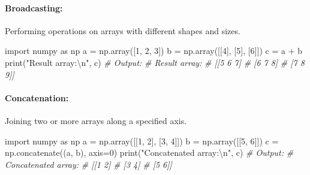 \documentclass[11pt]{article}
\newenvironment{Shaded}{}{}
\newcommand{\DecValTok}[1]{\textcolor[rgb]{0.25,0.63,0.44}{{#1}}}
\newcommand{\CharTok}[1]{\textcolor[rgb]{0.25,0.44,0.63}{{#1}}}
\newcommand{\StringTok}[1]{\textcolor[rgb]{0.25,0.44,0.63}{{#1}}}
\newcommand{\CommentTok}[1]{\textcolor[rgb]{0.38,0.63,0.69}{\textit{{#1}}}}
\newcommand{\NormalTok}[1]{{#1}}
\newcommand{\ImportTok}[1]{{#1}}
\newcommand{\OperatorTok}[1]{\textcolor[rgb]{0.40,0.40,0.40}{{#1}}}
\newcommand{\BuiltInTok}[1]{{#1}}
\begin{document}
\hypertarget{broadcasting}{%
\paragraph{Broadcasting:}\label{broadcasting}}

Performing operations on arrays with different shapes and sizes.

\begin{Shaded}
\begin{Highlighting}[]
\ImportTok{import}\NormalTok{ numpy }\ImportTok{as}\NormalTok{ np}
\NormalTok{a }\OperatorTok{=}\NormalTok{ np.array([}\DecValTok{1}\NormalTok{, }\DecValTok{2}\NormalTok{, }\DecValTok{3}\NormalTok{])}
\NormalTok{b }\OperatorTok{=}\NormalTok{ np.array([[}\DecValTok{4}\NormalTok{], [}\DecValTok{5}\NormalTok{], [}\DecValTok{6}\NormalTok{]])}
\NormalTok{c }\OperatorTok{=}\NormalTok{ a }\OperatorTok{+}\NormalTok{ b}
\BuiltInTok{print}\NormalTok{(}\StringTok{"Result array:}\CharTok{\textbackslash{}n}\StringTok{"}\NormalTok{, c)}
\CommentTok{\# Output:}
\CommentTok{\# Result array:}
\CommentTok{\#  [[5 6 7]}
\CommentTok{\#   [6 7 8]}
\CommentTok{\#   [7 8 9]]}
\end{Highlighting}
\end{Shaded}

\hypertarget{concatenation}{%
\paragraph{Concatenation:}\label{concatenation}}

Joining two or more arrays along a specified axis.

\begin{Shaded}
\begin{Highlighting}[]
\ImportTok{import}\NormalTok{ numpy }\ImportTok{as}\NormalTok{ np}
\NormalTok{a }\OperatorTok{=}\NormalTok{ np.array([[}\DecValTok{1}\NormalTok{, }\DecValTok{2}\NormalTok{], [}\DecValTok{3}\NormalTok{, }\DecValTok{4}\NormalTok{]])}
\NormalTok{b }\OperatorTok{=}\NormalTok{ np.array([[}\DecValTok{5}\NormalTok{, }\DecValTok{6}\NormalTok{]])}
\NormalTok{c }\OperatorTok{=}\NormalTok{ np.concatenate((a, b), axis}\OperatorTok{=}\DecValTok{0}\NormalTok{)}
\BuiltInTok{print}\NormalTok{(}\StringTok{"Concatenated array:}\CharTok{\textbackslash{}n}\StringTok{"}\NormalTok{, c)}
\CommentTok{\# Output:}
\CommentTok{\# Concatenated array:}
\CommentTok{\#  [[1 2]}
\CommentTok{\#   [3 4]}
\CommentTok{\#   [5 6]]}
\end{Highlighting}
\end{Shaded}
\end{document}
